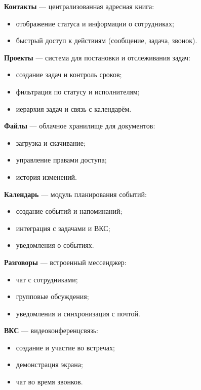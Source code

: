   \textbf{Контакты} — централизованная адресная книга:
  \begin{itemize}
    \item отображение статуса и информации о сотрудниках;
    \item быстрый доступ к действиям (сообщение, задача, звонок).
  \end{itemize}

  \textbf{Проекты} — система для постановки и отслеживания задач:
  \begin{itemize}
    \item создание задач и контроль сроков;
    \item фильтрация по статусу и исполнителям;
    \item иерархия задач и связь с календарём.
  \end{itemize}

  \textbf{Файлы} — облачное хранилище для документов:
  \begin{itemize}
    \item загрузка и скачивание;
    \item управление правами доступа;
    \item история изменений.
  \end{itemize}

  \textbf{Календарь} — модуль планирования событий:
  \begin{itemize}
    \item создание событий и напоминаний;
    \item интеграция с задачами и ВКС;
    \item уведомления о событиях.
  \end{itemize}

  \textbf{Разговоры} — встроенный мессенджер:
  \begin{itemize}
    \item чат с сотрудниками;
    \item групповые обсуждения;
    \item уведомления и синхронизация с почтой.
  \end{itemize}

  \textbf{ВКС} — видеоконференцсвязь:
  \begin{itemize}
    \item создание и участие во встречах;
    \item демонстрация экрана;
    \item чат во время звонков.
  \end{itemize}

